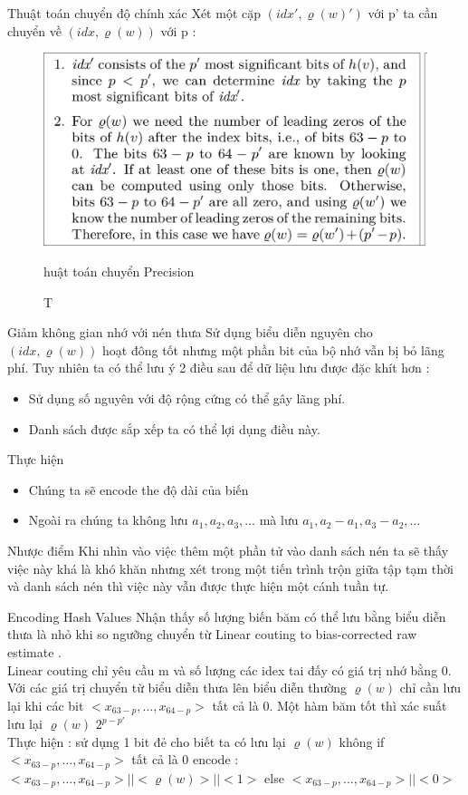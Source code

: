 \documentclass{beamer}
\begin{document}
\begin{frame}{Thuật toán chuyển độ chính xác}
Xét một cặp $(idx',\varrho(w)') $ với p' ta cần chuyển về $(idx,\varrho(w)) $ với p : 
\begin{figure}[H]
\includegraphics[scale=0.2]{HSR.png}
\caption Thuật toán chuyển Precision
\end{figure}

\end{frame}
\begin{frame}{Giảm không gian nhớ với nén thưa }
Sử dụng biểu diễn nguyên cho $(idx,\varrho(w)) $ hoạt đông tốt nhưng một phần bit của bộ nhớ vẫn bị bỏ lãng phí.
Tuy nhiên ta có thể lưu ý 2 điều sau để dữ liệu lưu được đặc khít hơn :
\begin{itemize}
\item Sử dụng số nguyên với độ rộng cứng có thể gây lãng phí.
\item Danh sách được sắp xếp ta có thể lợi dụng điều này.
\end{itemize}
\end{frame}
\begin{frame}{Thực hiện}
\begin{itemize}
\item Chúng ta sẽ encode the độ dài của biến
\item Ngoài ra chúng ta không lưu $a_1,a_2,a_3,...$ mà lưu $ a_1,a_2-a_1,a_3-a_2,...$
\end{itemize}
\end{frame}
\begin{frame}{Nhược điểm }
Khi nhìn vào việc thêm một phần tử vào danh sách nén ta sẽ thấy việc này khá là khó khăn nhưng xét trong một tiến trình trộn giữa tập tạm thời và danh sách nén thì việc này vẫn được thực hiện một cánh tuần tự.
\end{frame}
\begin{frame}{Encoding Hash Values}
Nhận thấy số lượng biến băm có thể lưu bằng biểu diễn thưa là nhỏ khi so ngưỡng chuyển từ Linear couting to bias-corrected raw
estimate . \\
Linear couting  chỉ yêu cầu m và số lượng các idex tai đấy có giá trị nhớ bằng 0.\\
Với các giá trị chuyển từ biểu diễn thưa lên biểu diễn thường $\varrho(w)$ chỉ cần lưu lại khi các bit $<x_{63-p} ,...,x_{64-p}>$ tất cả là 0. Một hàm băm tốt thì xác suất lưu lại  $\varrho(w)$ $ 2^{p-p'}$
\\Thực hiện : sử dụng 1 bit đẻ cho biết ta có lưu lại $\varrho(w)$ không 
if $<x_{63-p} ,...,x_{64-p}>$ tất cả là 0 encode :  $<x_{63-p} ,...,x_{64-p}> || <\varrho(w)>||<1>$
else $<x_{63-p} ,...,x_{64-p}> ||<0>$ 
\end{frame}
\end{document}
